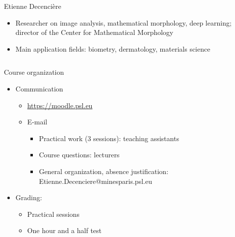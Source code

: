\documentclass[xcolor=pdftex,dvipsnames,table,mathserif]{beamer}
\begin{document}
{\begin{columns}
\begin{column}{.8\textwidth}
    \begin{block}{Etienne Decencière}
      \scriptsize{
    \begin{itemize}
    \item Researcher on image analysis, mathematical morphology, deep learning; director of the Center for Mathematical Morphology
    \item Main application fields: biometry, dermatology, materials science
    \end{itemize}
    }
  \end{block}

  \end{column}
\end{columns}

}

\begin{frame}{Course organization}

  \begin{itemize}

  \item Communication
    \begin{itemize}
    \item \url{https://moodle.psl.eu}
    \item E-mail
      \begin{itemize}
      \item Practical work (3 sessions): teaching assistants
      \item Course questions: lecturers
      \item General organization, absence justification: Etienne.Decenciere@minesparis.psl.eu
      \end{itemize}
    \end{itemize}
  \item Grading:
    \begin{itemize}
      \item Practical sessions
      \item One hour and a half test
    \end{itemize}

  \end{itemize}
\end{frame}
\end{document}
